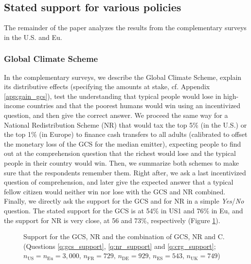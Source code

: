 \subsection{Stated support for various policies}
The remainder of the paper analyzes the results from the complementary surveys in the U.S. and Eu.

\subsubsection{Global Climate Scheme} %
In the complementary surveys, we describe the Global Climate Scheme, explain its distributive effects (specifying the amounts at stake, cf. Appendix \ref{app:gain_gcs}), test the understanding that typical people would lose in high-income countries and that the poorest humans would win using an incentivized question, and then give the correct answer. We proceed the same way for a National Redistribution Scheme (NR) that would tax the top 5\% (in the U.S.) or the top 1\% (in Europe) to finance cash transfers to all adults (calibrated to offset the monetary loss of the GCS for the median emitter), expecting people to find out at the comprehension question that the richest would lose and the typical people in their country would win. Then, we summarize both schemes to make sure that the respondents remember them. Right after, we ask a last incentivized question of comprehension, and later give the expected answer that a typical fellow citizen would neither win nor lose with the GCS and NR combined. Finally, we directly ask the support for the GCS and for NR in a simple \textit{Yes}/\textit{No} question. The stated support for the GCS is at 54\% in US1 and 76\% in Eu, and the support for NR is very close, at 56 and 73\%, respectively (Figure \ref{fig:support_binary}).%

\begin{figure}[h!]
    \caption[Support for the Global Climate Scheme]{Support for the GCS, NR and the combination of GCS, NR and C. (Questions \ref{q:gcs_support}, \ref{q:nr_support} and \ref{q:crg_support}; $n_\text{US} = n_\text{Eu} = 3,000,\, n_\text{FR} = 729,\, n_\text{DE} = 929,\, n_\text{ES} = 543,\, n_\text{UK} = 749$)}\label{fig:support_binary}
\end{figure}

